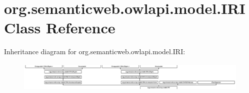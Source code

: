 \hypertarget{classorg_1_1semanticweb_1_1owlapi_1_1model_1_1_i_r_i}{\section{org.\-semanticweb.\-owlapi.\-model.\-I\-R\-I Class Reference}
\label{classorg_1_1semanticweb_1_1owlapi_1_1model_1_1_i_r_i}
}
Inheritance diagram for org.\-semanticweb.\-owlapi.\-model.\-I\-R\-I\-:\begin{figure}[H]
\begin{center}
\leavevmode
\includegraphics[height=1.431493cm]{classorg_1_1semanticweb_1_1owlapi_1_1model_1_1_i_r_i}
\end{center}
\end{figure}
